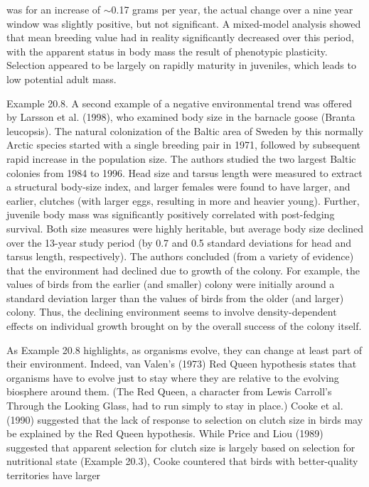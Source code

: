 \documentclass{article}
\begin{document}
was for an increase of  $ \sim $0.17 grams per year, the actual change over a nine year window was slightly positive, but not significant. A mixed-model analysis showed that mean breeding value had in reality significantly decreased over this period, with the apparent status in body mass the result of phenotypic plasticity. Selection appeared to be largely on rapidly maturity in juveniles, which leads to low potential adult mass.

Example 20.8. A second example of a negative environmental trend was offered by Larsson et al. (1998), who examined body size in the barnacle goose (Branta leucopsis). The natural colonization of the Baltic area of Sweden by this normally Arctic species started with a single breeding pair in 1971, followed by subsequent rapid increase in the population size. The authors studied the two largest Baltic colonies from 1984 to 1996. Head size and tarsus length were measured to extract a structural body-size index, and larger females were found to have larger, and earlier, clutches (with larger eggs, resulting in more and heavier young). Further, juvenile body mass was significantly positively correlated with post-fedging survival. Both size measures were highly heritable, but average body size declined over the 13-year study period (by 0.7 and 0.5 standard deviations for head and tarsus length, respectively). The authors concluded (from a variety of evidence) that the environment had declined due to growth of the colony. For example, the values of birds from the earlier (and smaller) colony were initially around a standard deviation larger than the values of birds from the older (and larger) colony. Thus, the declining environment seems to involve density-dependent effects on individual growth brought on by the overall success of the colony itself.

As Example 20.8 highlights, as organisms evolve, they can change at least part of their environment. Indeed, van Valen's (1973) Red Queen hypothesis states that organisms have to evolve just to stay where they are relative to the evolving biosphere around them. (The Red Queen, a character from Lewis Carroll's Through the Looking Glass, had to run simply to stay in place.) Cooke et al. (1990) suggested that the lack of response to selection on clutch size in birds may be explained by the Red Queen hypothesis. While Price and Liou (1989) suggested that apparent selection for clutch size is largely based on selection for nutritional state (Example 20.3), Cooke countered that birds with better-quality territories have larger
\end{document}
